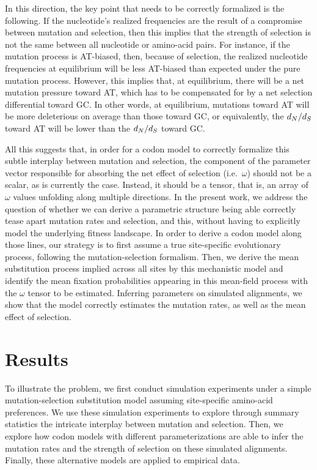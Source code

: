 In this direction, the key point that needs to be correctly formalized is the following.
If the nucleotide's realized frequencies are the result of a compromise between mutation and selection, then this implies that the strength of selection is not the same between all nucleotide or amino-acid pairs.
For instance, if the mutation process is AT-biased, then, because of selection, the realized nucleotide frequencies at equilibrium will be less AT-biased than expected under the pure mutation process.
However, this implies that, at equilibrium, there will be a net mutation pressure toward AT, which has to be compensated for by a net selection differential toward GC.
In other words, at equilibrium, mutations toward AT will be more deleterious on average than those toward GC, or equivalently, the $d_N / d_S$ toward AT will be lower than the $d_N / d_S$ toward GC.

All this suggests that, in order for a \gls{codon} model to correctly formalize this subtle interplay between mutation and selection, the component of the parameter vector responsible for absorbing the net effect of selection (i.e.~$\omega$) should not be a scalar, as is currently the case.
Instead, it should be a tensor, that is, an array of $\omega$ values unfolding along multiple directions.
In the present work, we address the question of whether we can derive a parametric structure being able correctly tease apart mutation rates and selection, and this, without having to explicitly model the underlying fitness landscape.
In order to derive a \gls{codon} model along those lines, our strategy is to first assume a true site-specific evolutionary process, following the mutation-selection formalism.
Then, we derive the mean \gls{substitution} process implied across all sites by this mechanistic model and identify the mean fixation probabilities appearing in this mean-field process with the $\omega$ tensor to be estimated.
Inferring parameters on simulated alignments, we show that the model correctly estimates the mutation rates, as well as the mean effect of selection.

\section{Results}
\label{sec:results}

To illustrate the problem, we first conduct simulation experiments under a simple mutation-selection \gls{substitution} model assuming site-specific amino-acid preferences.
We use these simulation experiments to explore through summary statistics the intricate interplay between mutation and selection.
Then, we explore how \gls{codon} models with different parameterizations are able to infer the mutation rates and the strength of selection on these simulated alignments.
Finally, these alternative models are applied to empirical data.

